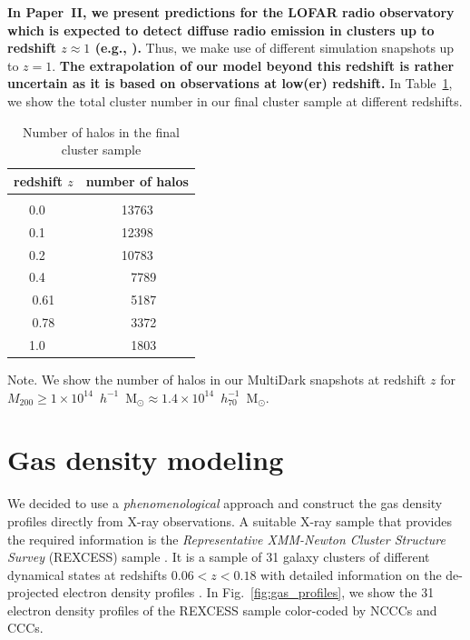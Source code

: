 \documentclass[useAMS,usenatbib]{mn2e}
\begin{document}
{\bf In Paper~II, we present predictions for the LOFAR radio observatory
which is expected to detect diffuse radio emission in clusters up to redshift $z \approx 1$ (e.g.,
\citealp{2012JApA..tmp...34R}).} Thus, we make use of different simulation snapshots up to $z=1$. 
{\bf The extrapolation of our model beyond this redshift is rather uncertain as it is based
on observations at low(er) redshift.} In Table~\ref{tab:z}, we show the total cluster number in 
our final cluster sample at different redshifts.

\begin{table} 
\begin{center}
\caption{Number of halos in the final cluster sample}
\medskip
\begin{tabular}{cc}
\hline
\phantom{\Big|}
redshift $z$ & number of halos \\
\hline\\[-0.5em]
 0.0~~ &  13763\\
 0.1~~ &  12398\\
 0.2~~ &  10783\\ 
 0.4~~ &   ~~7789\\ 
 0.61  &  ~~5187\\ 
 0.78  &  ~~3372\\ 
 1.0~~ &  ~~1803\\[0.5em]
\hline
\end{tabular}
\label{tab:z}
\end{center}
\footnotesize{Note. We show the number of halos in our MultiDark snapshots at redshift $z$ for $M_{200}\geq1\times10^{14}$~$h^{-1}$~M$_{\odot}\approx1.4\times10^{14}$~$h_{70}^{-1}$~M$_{\odot}$. }
\end{table}


\section{Gas density modeling}
\label{sec:3}

We decided to use a \emph{phenomenological} approach and construct the gas
density profiles directly from X-ray observations. A suitable X-ray sample that
provides the required information is the \emph{Representative XMM-Newton Cluster
  Structure Survey} (REXCESS) sample \citep{2008A&A...487..431C,
  2009A&A...498..361P}. It is a sample of 31 galaxy clusters of different
dynamical states at redshifts $0.06<z<0.18$ with detailed information on the
de-projected electron density profiles \citep{2008A&A...487..431C}. In
Fig.~\ref{fig:gas_profiles}, we show the 31 electron density profiles of the
REXCESS sample color-coded by NCCCs and CCCs.
\end{document}
